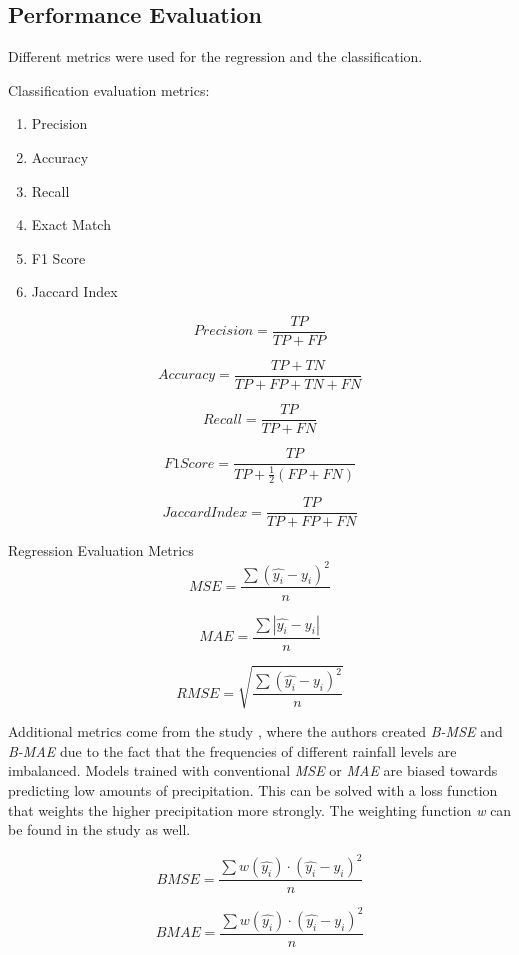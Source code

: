\subsection{Performance Evaluation}

Different metrics were used for the regression and the classification.

Classification evaluation metrics:
\begin{enumerate}
  \item Precision
  \item Accuracy
  \item Recall
  \item Exact Match
  \item F1 Score
  \item Jaccard Index
\end{enumerate}


\begin{equation}
  Precision = \frac{TP}{TP + FP}
\end{equation}

\begin{equation}
  Accuracy = \frac{TP+ TN}{TP + FP + TN + FN}
\end{equation}

\begin{equation}
  Recall = \frac{TP}{TP + FN}
\end{equation}

\begin{equation}
  F1Score = \frac{TP}{TP + \frac{1}{2}(FP + FN)}
\end{equation}

\begin{equation}
  Jaccard Index = \frac{TP}{TP + FP + FN}
\end{equation}

Regression Evaluation Metrics
\begin{equation}
  MSE = \frac{\sum (\hat{y_i} -y_i)^2}{n}
\end{equation}

\begin{equation}
MAE = \frac{\sum |\hat{y_i} -y_i|}{n}
\end{equation}

\begin{equation}
RMSE = \sqrt{\frac{\sum (\hat{y_i} -y_i)^2}{n}}
\end{equation}

Additional metrics come from the study \cite{shi2017deep}, where the authors created \textit{B-MSE} and \textit{B-MAE} due to the fact that the frequencies of different rainfall levels are imbalanced. Models trained with conventional \textit{MSE} or \textit{MAE} are biased towards predicting low amounts of precipitation. This can be solved with a loss function that weights the higher precipitation more strongly. The weighting function \textit{w} can be found in the study as well.

\begin{equation}
BMSE = \frac{\sum w(\hat{y_i}) \cdot (\hat{y_i} -y_i)^2}{n}
\end{equation}

\begin{equation}
BMAE = \frac{\sum w(\hat{y_i})  \cdot (\hat{y_i} -y_i)^2}{n}
\end{equation}
